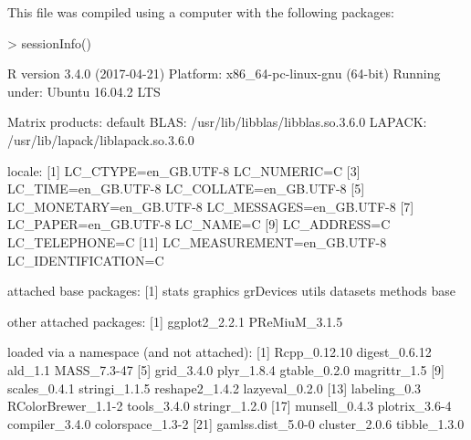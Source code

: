 \documentclass{article}
\begin{document}
This file was compiled using a computer with the following packages: 

\begin{Schunk}
\begin{Sinput}
> sessionInfo()
\end{Sinput}
\begin{Soutput}
R version 3.4.0 (2017-04-21)
Platform: x86_64-pc-linux-gnu (64-bit)
Running under: Ubuntu 16.04.2 LTS

Matrix products: default
BLAS: /usr/lib/libblas/libblas.so.3.6.0
LAPACK: /usr/lib/lapack/liblapack.so.3.6.0

locale:
 [1] LC_CTYPE=en_GB.UTF-8       LC_NUMERIC=C              
 [3] LC_TIME=en_GB.UTF-8        LC_COLLATE=en_GB.UTF-8    
 [5] LC_MONETARY=en_GB.UTF-8    LC_MESSAGES=en_GB.UTF-8   
 [7] LC_PAPER=en_GB.UTF-8       LC_NAME=C                 
 [9] LC_ADDRESS=C               LC_TELEPHONE=C            
[11] LC_MEASUREMENT=en_GB.UTF-8 LC_IDENTIFICATION=C       

attached base packages:
[1] stats     graphics  grDevices utils     datasets  methods   base     

other attached packages:
[1] ggplot2_2.2.1 PReMiuM_3.1.5

loaded via a namespace (and not attached):
 [1] Rcpp_0.12.10       digest_0.6.12      ald_1.1            MASS_7.3-47       
 [5] grid_3.4.0         plyr_1.8.4         gtable_0.2.0       magrittr_1.5      
 [9] scales_0.4.1       stringi_1.1.5      reshape2_1.4.2     lazyeval_0.2.0    
[13] labeling_0.3       RColorBrewer_1.1-2 tools_3.4.0        stringr_1.2.0     
[17] munsell_0.4.3      plotrix_3.6-4      compiler_3.4.0     colorspace_1.3-2  
[21] gamlss.dist_5.0-0  cluster_2.0.6      tibble_1.3.0      
\end{Soutput}
\end{Schunk}



\end{document}
